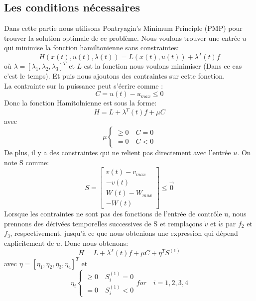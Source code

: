 \documentclass[lettersize,journal]{IEEEtran}
\begin{document}
\subsection{Les conditions nécessaires}
Dans cette partie nous utilisons Pontryagin’s Minimum Principle (PMP) pour trouver la solution optimale de ce problème. Nous voulons trouver une entrée $u$ qui minimise la fonction hamiltonienne sans constraintes:
\begin{equation}
    H(x(t),u(t),\lambda(t)) = L(x(t),u(t)) + \lambda^{T}(t)f
\end{equation}
où $\lambda = [\lambda_1, \lambda_2, \lambda_3]^{T}$ et $L$ est la fonction nous voulons minimiser (Dans ce cas c'est le temps).
Et puis nous ajoutons des contraintes sur cette fonction.\\
La contrainte sur la puissance peut s'écrire comme :
\begin{equation}
    C = u(t) - u_{max} \leq 0
\end{equation}
Donc la fonction Hamitolnienne est sous la forme:
\begin{equation}
    H = L + \lambda^{T}(t)f + \mu C
\end{equation}
avec
\begin{equation}
    \mu \begin{cases}
        \geq 0 \quad C=0\\
         = 0 \quad C < 0
    \end{cases}
\end{equation}
De plus, il y a des constraintes qui ne relient pas directement avec l'entrée $u$. On note S comme:
\begin{equation}
    S = \begin{bmatrix}
	v(t) - v_{max}  \\
    -v(t) \\
    W(t) - W_{max}\\
    -W(t)
\end{bmatrix} \leq \Vec{0}
\end{equation}
Lorsque les contraintes ne sont pas des fonctions de l’entrée de contrôle u, nous prennons des dérivées temporelles successives de S et remplaçons $\dot{v}$ et $\dot{w}$ par $f_2$ et $f_3$, respectivement, jusqu’à ce que nous obtenions une expression qui dépend explicitement de $u$. Donc nous obtenons:
\begin{equation}
    H = L + \lambda^{T}(t)f + \mu C + \eta^{T}S^{(1)}
\end{equation}
avec $\eta = [\eta_1,\eta_2,\eta_3,\eta_4]^{T}$ et
\begin{equation}
    \eta_{i}\begin{cases}
        \geq 0 \quad S_{i}^{(1)} = 0\\
         = 0 \quad S_{i}^{(1)} < 0
    \end{cases} for \quad i = 1,2,3,4
\end{equation}
\end{document}
